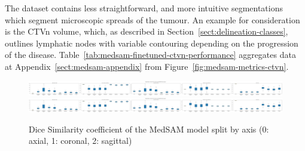 \documentclass[12pt,twoside]{report}
\begin{document}
The dataset contains less straightforward, and more intuitive segmentations which segment microscopic spreads of the tumour. An example for consideration is the CTVn volume, which, as described in Section~\ref{sect:delineation-classes}, outlines lymphatic nodes with variable contouring depending on the progression of the disease. Table~\ref{tab:medsam-finetuned-ctvn-performance} aggregates data at Appendix~\ref{sect:medsam-appendix} from Figure~\ref{fig:medsam-metrics-ctvn}.

\begin{table}[h!]
  \centering
  \caption{Performance of models on the CTVn delineation.}
  \label{tab:medsam-finetuned-ctvn-performance}
\end{table}

\begin{figure}[H]
  \centering
  \includegraphics[height=.23\textheight, trim=1350px 0 5220px 0, clip]{../../research/source/code/data/metrics/metricsctvn_1_combinednotable_MedSAM_split_analysis.png}
  \includegraphics[height=.23\textheight, trim=2125px 0 4040px 0, clip]{../../research/source/code/data/metrics/metricsctvn_1_combinednotable_MedSAM_split_analysis.png}

  \caption{Dice Similarity coefficient of the MedSAM model split by axis (0: axial, 1: coronal, 2: sagittal)}\label{fig:medsam-finetuned-axis-split}
\end{figure}
\end{document}

